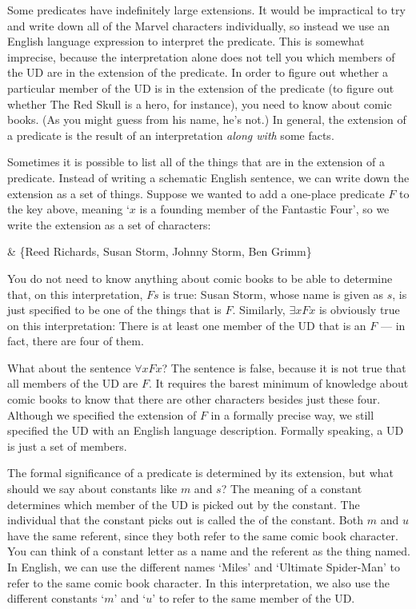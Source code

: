 Some predicates have indefinitely large extensions. It would be impractical to try and write down all of the Marvel characters individually, so instead we use an English language expression to interpret the predicate. This is somewhat imprecise, because the interpretation alone does not tell you which members of the UD are in the extension of the predicate. In order to figure out whether a particular member of the UD is in the extension of the predicate (to figure out whether The Red Skull is a hero, for instance), you need to know about comic books. (As you might guess from his name, he's not.) In general, the extension of a predicate is the result of an interpretation \emph{along with} some facts.

Sometimes it is possible to list all of the things that are in the extension of a predicate. Instead of writing a schematic English sentence, we can write down the extension as a set of things. Suppose we wanted to add a one-place predicate $F$ to the key above, meaning `$x$ is a founding member of the Fantastic Four', so we write the extension as a set of characters:
\begin{partialmodel}
	 & \{Reed Richards, Susan Storm, Johnny Storm, Ben Grimm\}
\end{partialmodel}

You do not need to know anything about comic books to be able to determine that, on this interpretation, $Fs$ is true: Susan Storm, whose name is given as $s$, is just specified to be one of the things that is $F$. Similarly, $\exists x Fx$ is obviously true on this interpretation: There is at least one member of the UD that is an $F$ --- in fact, there are four of them.

What about the sentence $\forall x Fx$? The sentence is false, because it is not true that all members of the UD are $F$. It requires the barest minimum of knowledge about comic books to know that there are other characters besides just these four. Although we specified the extension of $F$ in a formally precise way, we still specified the UD with an English language description. Formally speaking, a UD is just a set of members.

The formal significance of a predicate is determined by its extension, but what should we say about constants like $m$ and $s$? The meaning of a constant determines which member of the UD is picked out by the constant. The individual that the constant picks out is called the  of the constant. Both $m$ and $u$ have the same referent, since they both refer to the same comic book character. You can think of a constant letter as a name and the referent as the thing named. In English, we can use the different names `Miles' and `Ultimate Spider-Man' to refer to the same comic book character. In this interpretation, we also use the different constants `$m$' and `$u$' to refer to the same member of the UD.

